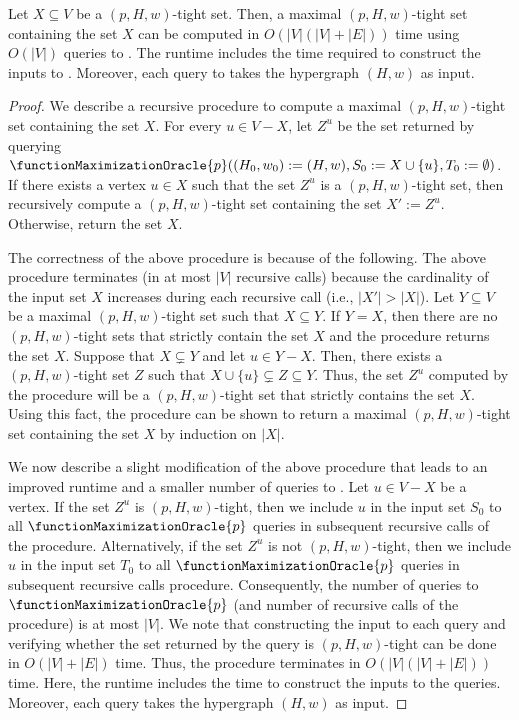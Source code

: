 \begin{claim}\label{claim:FunctionMaximizetionOracles:maximal-tight-set-containing-given-tight-set}
         Let $X \subseteq V$ be a $(p, H, w)$-tight set. Then, a maximal $(p, H, w)$-tight set containing the set $X$ can be computed in $O(|V|(|V|+|E|))$ time using $O(|V|)$ queries to . The runtime includes the time required to construct the inputs to . Moreover, each query to  takes the hypergraph $(H, w)$ as input.
\end{claim}
\begin{proof}
We describe a recursive procedure to compute a maximal $(p, H, w)$-tight set containing the set $X$. For every $u \in V - X$, let $Z^u$ be the set returned by querying $\functionMaximizationOracle{p}((H_0, w_0):= (H, w), S_0 := X\cup\{u\}, T_0 := \emptyset)$. If there exists a vertex $u \in X$ such that the set $Z^u$ is a $(p, H, w)$-tight set, then recursively compute a $(p, H, w)$-tight set containing the set $X':= Z^u$. Otherwise, return the set $X$. 

The correctness of the above procedure is because of the following. The above procedure terminates (in at most $|V|$ recursive calls) because the cardinality of the input set $X$ increases during each recursive call (i.e., $|X'| > |X|$). Let $Y \subseteq V$ be a maximal $(p, H, w)$-tight set such that $X \subseteq Y$. If $Y = X$, then there are no $(p, H, w)$-tight sets that strictly contain the set $X$ and the procedure returns the set $X$. Suppose that $X \subsetneq Y$ and let $u \in Y - X$. Then, there exists a $(p, H, w)$-tight set $Z$ such that $X\cup\{u\} \subsetneq Z \subseteq Y$. Thus, the set $Z^u$ computed by the procedure will be a $(p, H, w)$-tight set that strictly contains the set $X$. Using this fact, the procedure can be shown to return a maximal $(p, H, w)$-tight set containing the set $X$ by induction on $|X|$.   
    
We now describe a slight modification of the above procedure that leads to an improved runtime and a smaller number of queries to . Let $u \in V - X$ be a vertex. If the set $Z^{u}$ is $(p, H, w)$-tight, then we include $u$ in the input set $S_0$ to all $\functionMaximizationOracle{p}$ queries in subsequent recursive calls of the procedure. Alternatively, if the set $Z^{u}$ is not $(p, H, w)$-tight, then we include $u$ in the input set $T_0$ to all $\functionMaximizationOracle{p}$ queries in subsequent recursive calls procedure. Consequently, the number of queries to $\functionMaximizationOracle{p}$ (and number of recursive calls of the procedure) is at most $|V|$. We note that constructing the input to each query and verifying whether the set returned by the query is $(p, H, w)$-tight can be done in $O(|V| + |E|)$ time. Thus, the procedure terminates in $O(|V|(|V|+|E|))$ time. Here, the runtime includes the time to construct the inputs to the  queries. Moreover, each query takes the hypergraph $(H,w)$ as input. 
\end{proof}
    
